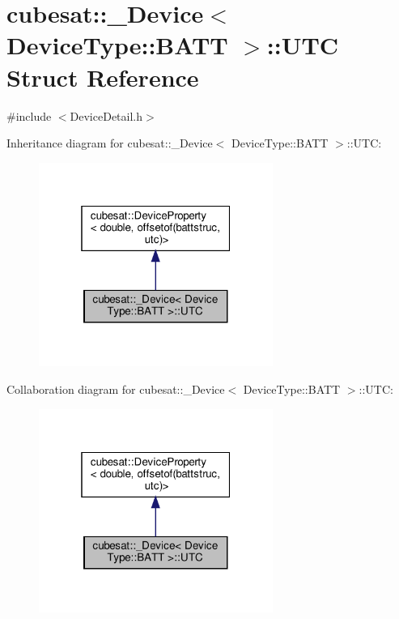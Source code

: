 \hypertarget{structcubesat_1_1__Device_3_01DeviceType_1_1BATT_01_4_1_1UTC}{}\section{cubesat\+:\+:\+\_\+\+Device$<$ Device\+Type\+:\+:B\+A\+TT $>$\+:\+:U\+TC Struct Reference}
\label{structcubesat_1_1__Device_3_01DeviceType_1_1BATT_01_4_1_1UTC}


{\ttfamily \#include $<$Device\+Detail.\+h$>$}



Inheritance diagram for cubesat\+:\+:\+\_\+\+Device$<$ Device\+Type\+:\+:B\+A\+TT $>$\+:\+:U\+TC\+:\nopagebreak
\begin{figure}[H]
\begin{center}
\leavevmode
\includegraphics[width=217pt]{structcubesat_1_1__Device_3_01DeviceType_1_1BATT_01_4_1_1UTC__inherit__graph}
\end{center}
\end{figure}


Collaboration diagram for cubesat\+:\+:\+\_\+\+Device$<$ Device\+Type\+:\+:B\+A\+TT $>$\+:\+:U\+TC\+:\nopagebreak
\begin{figure}[H]
\begin{center}
\leavevmode
\includegraphics[width=217pt]{structcubesat_1_1__Device_3_01DeviceType_1_1BATT_01_4_1_1UTC__coll__graph}
\end{center}
\end{figure}
